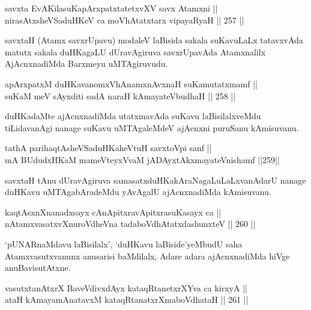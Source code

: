 \begin{shl}
savxta EvAKilasuKapArxpatxtatetxvXV savx Atamxni || \\
nirasAtxsheVSaduHKeV ca moVhAtatxtarx vipayaRyaH \hfill || 257 ||  
\end{shl}

\begin{artha}
savxtaH (Atamx savxrUpavu) modaleV laBisida sakala suKavuLaLx
tatavxvAda matutx sakala duHKagaLU dUravAgiruva savxrUpavAda
Atamxnalilx AjAcnxnadiMda Barxmeyu uMTAgiruvudu.
\end{artha}


\begin{shl}
apArxpatxM duHKavanomxVhAnamxnAvxnaH suKamutatxmamf || \\
suKaM meV sAyxditi sadA naraH kAmayateV\s budhaH \hfill || 258 ||  
\end{shl}

\begin{artha}
duHKadaMte ajAcnxnadiMda utatxmavAda suKavu laBisilalxveMdu
tiLidavanAgi nanage suKavu uMTAgaleMdeV ajAcnxni puruSanu kAmisuvanu.
\end{artha}

\begin{shl}
tathA parihaqtAsheVSaduHKaheVtuH savxtoV\s pi sanf || \\
mA BUdudxHKaM mameVteyxVvaM jADAyxtAkxmayateV\s nishamf \hfill ||259|| 
\end{shl}

\begin{artha}
savxtaH tAnu dUravAgiruva samasatxduHKakAraNagaLuLaLxvanAdarU nanage
duHKavu uMTAgabAradeMdu yAvAgalU ajAcnxnadiMda kAmisuvanu.
\end{artha}

\begin{shl}
kaqtAsxnXnanadxsayx cAnApitxravApitxrasuKasayx ca || \\
nA\s \s tamxvasatxvXnuroVdheVna tadaboVdhAtatxdashunxteV \hfill || 260 ||  
\end{shl}

\begin{artha}
`pUNARnaMdavu laBisilalx', `duHKavu laBiside'yeMbudU saha
Atamxvasutxvanunx anusarisi baMdilalx, Adare adara ajAcnxnadiMda hiVge anuBavisutAtxne.
\end{artha}

\begin{shl}
vasutxtanAtxrX BaveVdivxdAyx kataqRtanetxrXYva ca kirxyA ||  \\
ataH kAmayamAnatavxM kataqRtanatxrXmaboVdhataH \hfill || 261 ||  
\end{shl}

